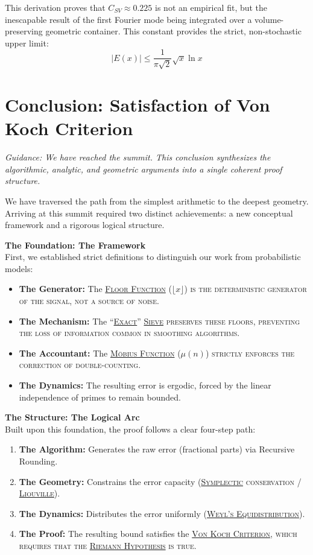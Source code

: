 \documentclass[sn-mathphys-num, pdflatex]{sn-jnl}
\newcommand{\gterm}[2]{\begingroup\normalfont\scshape\hyperlink{#1}{#2}\endgroup}
\begin{document}
This derivation proves that $C_{SV} \approx 0.225$ is not an empirical fit, but the inescapable result of the first Fourier mode being integrated over a volume-preserving geometric container.
This constant provides the strict, non-stochastic upper limit:
\begin{equation}
|E(x)| \le \frac{1}{\pi\sqrt{2}} \sqrt{x} \ln x
\end{equation}

\section{Conclusion: Satisfaction of Von Koch Criterion}

\textit{Guidance: We have reached the summit. This conclusion synthesizes the algorithmic, analytic, and geometric arguments into a single coherent proof structure.} 

We have traversed the path from the simplest arithmetic to the deepest geometry. Arriving at this summit required two distinct achievements: a new conceptual framework and a rigorous logical structure.

\textbf{The Foundation: The Framework}\\
First, we established strict definitions to distinguish our work from probabilistic models:
\begin{itemize}
    \item \textbf{The Generator:} The \gterm{floor_function}{Floor Function} ($\lfloor x \rfloor$) is the deterministic generator of the signal, not a source of noise.
    \item \textbf{The Mechanism:} The ``\gterm{exact_sieve}{Exact}'' \gterm{exact_sieve}{Sieve} preserves these floors, preventing the loss of information common in smoothing algorithms.
    \item \textbf{The Accountant:} The \gterm{MF}{Möbius Function} ($\mu(n)$) strictly enforces the correction of double-counting.
    \item \textbf{The Dynamics:} The resulting error is ergodic, forced by the linear independence of primes to remain bounded.
\end{itemize}

\textbf{The Structure: The Logical Arc}\\
Built upon this foundation, the proof follows a clear four-step path:
\begin{enumerate}
    \item \textbf{The Algorithm:} Generates the raw error (fractional parts) via Recursive Rounding.
    \item \textbf{The Geometry:} Constrains the error capacity (\gterm{geometry}{Symplectic} conservation / \gterm{liouville}{Liouville}).
    \item \textbf{The Dynamics:} Distributes the error uniformly (\gterm{weyl}{Weyl's Equidistribution}).
    \item \textbf{The Proof:} The resulting bound satisfies the \gterm{von_koch}{Von Koch Criterion}, which requires that the \gterm{rh}{Riemann Hypothesis} is true.
\end{enumerate}
\end{document}

